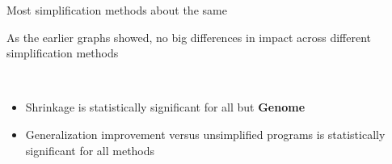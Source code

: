 \documentclass{beamer}
\begin{document}
\begin{frame}{Most simplification methods about the same}

As the earlier graphs showed, no big differences in impact across different simplification methods

~

\begin{itemize}
	\item Shrinkage is statistically significant for all but \textbf{Genome}
	\item Generalization improvement versus unsimplified programs is statistically significant for all methods
\end{itemize}



\end{frame}
\end{document}
